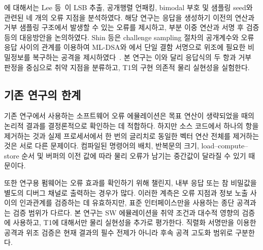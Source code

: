 에 대해서는 Lee 등~\cite{lee2026haetae}이 LSB 추출,
공개행렬 언패킹, bimodal 부호 및 샘플링 seed와 관련된 네 개의 오류
지점을 분석하였다. 해당 연구는 응답을 생성하기 이전의 연산과 거부
샘플링 구조에서 발생할 수 있는 오류를 제시하고, 부분 이중 연산과 서명
후 검증 등의 대응방안을 논의하였다. Shin 등은 challenge sampling
절차의 공개계수와 오류 응답 사이의 관계를 이용하여 ML-DSA와
에서 단일 결함 서명으로 위조에 필요한 비밀정보를
복구하는 공격을 제시하였다~\cite{shin2026public}. 본 연구는 이와
달리 응답식의 두 항과 거부 판정을 중심으로 취약 지점을 분류하고,
T1의 구현 의존적 물리 실현성을 실험한다.

\subsection{기존 연구의 한계}

기존 연구에서 사용하는 소프트웨어 오류 에뮬레이션은 목표 연산이
생략되었을 때의 논리적 결과를 결정론적으로 확인하는 데 적합하다. 하지만
소스 코드에서 하나의 항을 제거하는 것과 실제 프로세서에서 한 번의
글리치로 동일한 벡터 연산 전체를 제거하는 것은 서로 다른 문제이다.
컴파일된 명령어의 배치, 반복문의 크기, load--compute--store 순서 및
버퍼의 이전 값에 따라 물리 오류가 남기는 중간값이 달라질 수 있기
때문이다.

또한 연구용 펌웨어는 오류 효과를 확인하기 위해 챌린지, 내부 응답 또는
참 비밀값을 별도의 디버그 채널로 출력하는 경우가 많다. 이러한 계측은
오류 지점과 정보 노출 사이의 인과관계를 검증하는 데 유효하지만, 표준
인터페이스만을 사용하는 종단 공격과는 검증 범위가 다르다. 본 연구는
SW 에뮬레이션을 취약 조건과 대수적 영향의 검증에 사용하고, T1에
대해서만 물리 실현성을 추가로 평가한다. 직렬화 서명만을 이용한 공격과
위조 검증은 현재 결과의 필수 전제가 아니라 후속 공격 고도화 범위로
구분한다.
